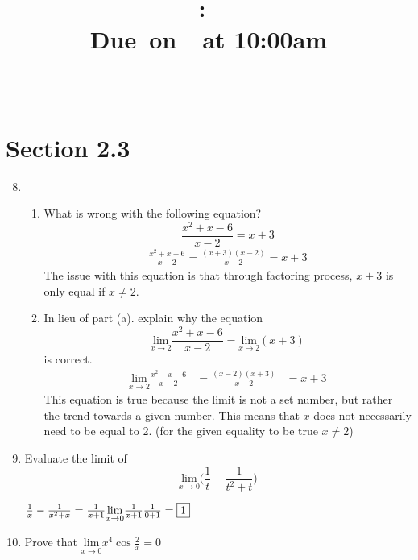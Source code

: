 \documentclass{article}
\title{
    \vspace{2in}
    \textmd{\textbf{\hmwkClass:\ \hmwkTitle}}\\
    \normalsize\vspace{0.1in}\small{Due\ on\ \hmwkDueDate\ at 10:00am}\\
    \vspace{0.1in}\large{\textit{\hmwkClassInstructor\ \hmwkClassTime}}
    \vspace{3in}
}
\author{\hmwkAuthorName}
\date{}
\begin{document}
\maketitle

\pagebreak

\section{Section 2.3}

\begin{enumerate}
\setcounter{enumi}{7}
	\item\begin{enumerate}
		\item What is wrong with the following equation? $$\frac{x^2+x-6}{x-2}=x+3$$
		$$\begin{align}
			\frac{x^2+x-6}{x-2} = \frac{(x+3)(x-2)}{x-2} = x+3
		\end{align}$$
			The issue with this equation is that through factoring process, $x+3$ is only equal if $x\neq 2$.
		\item In lieu of part (a). explain why the equation $$\underset{x\rightarrow 2}{\text{lim}}\frac{x^2+x-6}{x-2}=\underset{x\rightarrow 2}{\text{lim}} (x+3)$$ is correct.
		$$\begin{align}
			\underset{x\rightarrow 2}{\text{lim}}\frac{x^2+x-6}{x-2} &= \frac{(x-2)(x+3)}{x-2} &= x+3
		\end{align}$$
		This equation is true because the limit is not a set number, but rather the trend towards a given number. This means that $x$ does not necessarily need to be equal to 2. (for the given equality to be true $x \neq 2$)
	\end{enumerate}
\setcounter{enumi}{21}
	\item Evaluate the limit of $$\underset{x\rightarrow 0}{\text{lim}}\Big(\frac{1}{t}-\frac{1}{t^2+t}\Big) $$
	
	$\frac{1}{x}-\frac{1}{x^2+x}=\frac{1}{x+1} \\ 
	 \underset{x\rightarrow 0}{\text{lim}} \frac{1}{x+1} \\ 
	 \frac{1}{0+1} = \boxed{1}$
\setcounter{enumi}{30}
	\item Prove that $\underset{x\rightarrow 0}{\text{lim}}x^4\cos \frac{2}{x}=0$
	

\end{enumerate}
\end{document}
